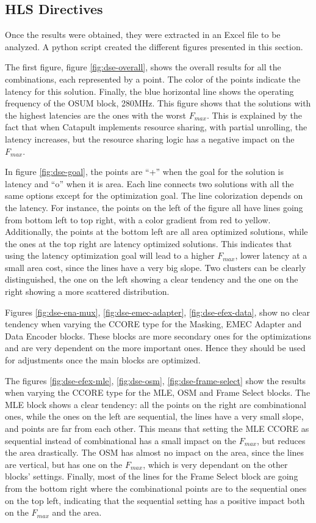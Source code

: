 \subsection{HLS Directives}

Once the results were obtained, they were extracted in an Excel file to be analyzed. A python script created the different figures presented in this section. 

The first figure, figure \ref{fig:dse-overall}, shows the overall results for all the combinations, each represented by a point. The color of the points indicate the latency for this solution. Finally, the blue horizontal line shows the operating frequency of the OSUM block, 280MHz. This figure shows that the solutions with the highest latencies are the ones with the worst \(F_{max}\). This is explained by the fact that when Catapult implements resource sharing, with partial unrolling, the latency increases, but the resource sharing logic has a negative impact on the \(F_{max}\).

In figure \ref{fig:dse-goal}, the points are ``+'' when the goal for the solution is latency and ``o'' when it is area. Each line connects two solutions with all the same options except for the optimization goal. The line colorization depends on the latency. For instance, the points on the left of the figure all have lines going from bottom left to top right, with a color gradient from red to yellow. Additionally, the points at the bottom left are all area optimized solutions, while the ones at the top right are latency optimized solutions. This indicates that using the latency optimization goal will lead to a higher \(F_{max}\), lower latency at a small area cost, since the lines have a very big slope. Two clusters can be clearly distinguished, the one on the left showing a clear tendency and the one on the right showing a more scattered distribution.

Figures \ref{fig:dse-ena-mux}, \ref{fig:dse-emec-adapter}, \ref{fig:dse-efex-data}, show no clear tendency when varying the CCORE type for the Masking, EMEC Adapter and Data Encoder blocks. These blocks are more secondary ones for the optimizations and are very dependent on the more important ones. Hence they should be used for adjustments once the main blocks are optimized.

The figures \ref{fig:dse-efex-mle}, \ref{fig:dse-osm}, \ref{fig:dse-frame-select} show the results when varying the CCORE type for the MLE, OSM and Frame Select blocks. The MLE block shows a clear tendency: all the points on the right are combinational ones, while the ones on the left are sequential, the lines have a very small slope, and points are far from each other. This means that setting the MLE CCORE as sequential instead of combinational has a small impact on the \(F_{max}\), but reduces the area drastically. The OSM has almost no impact on the area, since the lines are vertical, but has one on the \(F_{max}\), which is very dependant on the other blocks' settings. Finally, most of the lines for the Frame Select block are going from the bottom right where the combinational points are to the sequential ones on the top left, indicating that the sequential setting has a positive impact both on the \(F_{max}\) and the area.


